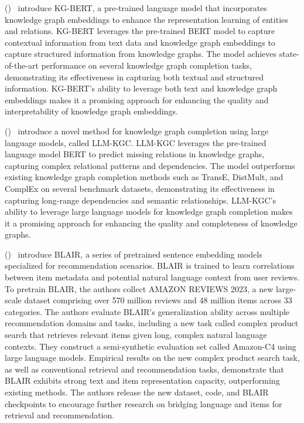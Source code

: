 \documentclass[11pt,a4paper,openany,oneside,titlepage]{article}
\newcommand{\citewithnumber}[1]{%
  \citeauthor{#1} (\citeyear{#1})~\cite{#1}%
}
\begin{document}
\citewithnumber {zhang2021kgbert} introduce KG-BERT, a pre-trained language model that incorporates knowledge graph embeddings to enhance the representation learning of entities and relations. KG-BERT leverages the pre-trained BERT model to capture contextual information from text data and knowledge graph embeddings to capture structured information from knowledge graphs. The model achieves state-of-the-art performance on several knowledge graph completion tasks, demonstrating its effectiveness in capturing both textual and structured information. KG-BERT's ability to leverage both text and knowledge graph embeddings makes it a promising approach for enhancing the quality and interpretability of knowledge graph embeddings.

\citewithnumber {ullah2021llm-kgc} introduce a novel method for knowledge graph completion using large language models, called LLM-KGC. LLM-KGC leverages the pre-trained language model BERT to predict missing relations in knowledge graphs, capturing complex relational patterns and dependencies. The model outperforms existing knowledge graph completion methods such as TransE, DistMult, and ComplEx on several benchmark datasets, demonstrating its effectiveness in capturing long-range dependencies and semantic relationships. LLM-KGC's ability to leverage large language models for knowledge graph completion makes it a promising approach for enhancing the quality and completeness of knowledge graphs.

\citewithnumber {hou2024bridging}  introduce BLAIR, a series of pretrained sentence embedding models specialized for recommendation scenarios. BLAIR is trained to learn correlations between item metadata and potential natural language context from user reviews. To pretrain BLAIR, the authors collect AMAZON REVIEWS 2023, a new large-scale dataset comprising over 570 million reviews and 48 million items across 33 categories.
The authors evaluate BLAIR's generalization ability across multiple recommendation domains and tasks, including a new task called complex product search that retrieves relevant items given long, complex natural language contexts. They construct a semi-synthetic evaluation set called Amazon-C4 using large language models.
Empirical results on the new complex product search task, as well as conventional retrieval and recommendation tasks, demonstrate that BLAIR exhibits strong text and item representation capacity, outperforming existing methods. The authors release the new dataset, code, and BLAIR checkpoints to encourage further research on bridging language and items for retrieval and recommendation.
\end{document}
